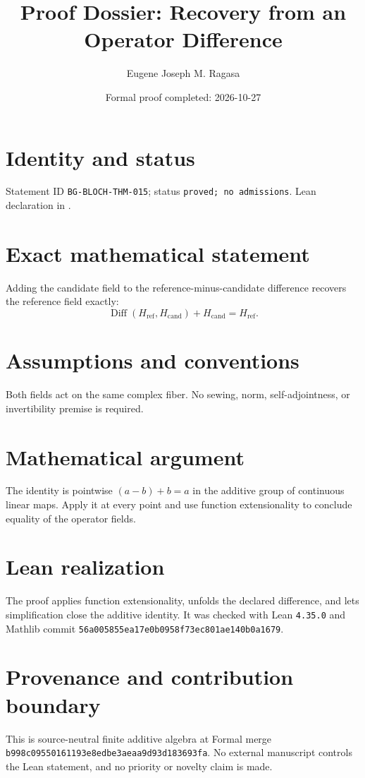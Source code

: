 \documentclass[11pt]{article}
\title{Proof Dossier: Recovery from an Operator Difference}
\author{Eugene Joseph M. Ragasa}
\date{Formal proof completed: 2026-10-27}
\begin{document}
\raggedright
\maketitle

\section{Identity and status}
Statement ID \texttt{BG-BLOCH-THM-015}; status \texttt{proved; no admissions}. Lean declaration
 in
.

\section{Exact mathematical statement}
Adding the candidate field to the reference-minus-candidate difference recovers the reference
field exactly:
\[
  \operatorname{Diff}(H_{\mathrm{ref}},H_{\mathrm{cand}})
  +H_{\mathrm{cand}}=H_{\mathrm{ref}}.
\]

\section{Assumptions and conventions}
Both fields act on the same complex fiber. No sewing, norm, self-adjointness, or invertibility
premise is required.

\section{Mathematical argument}
The identity is pointwise $(a-b)+b=a$ in the additive group of continuous linear maps. Apply it
at every point and use function extensionality to conclude equality of the operator fields.

\section{Lean realization}
The proof applies function extensionality, unfolds the declared difference, and lets
simplification close the additive identity. It was checked with Lean \texttt{4.35.0} and Mathlib
commit \texttt{56a005855ea17e0b0958f73ec801ae140b0a1679}.

\section{Provenance and contribution boundary}
This is source-neutral finite additive algebra at Formal merge
\texttt{b998c09550161193e8edbe3aeaa9d93d183693fa}. No external manuscript controls the Lean
statement, and no priority or novelty claim is made.
\end{document}
